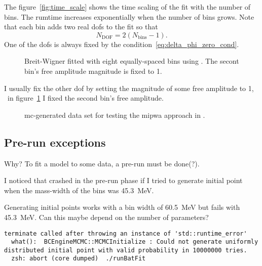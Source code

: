     The figure~\ref{fig:time_scale} shows the time scaling of the fit with the number of bins.
    The rumtime increases exponentially when the number of bins grows.
    Note that each bin adds two real \acp{dof} to the fit so that
    \begin{equation}
        N_\text{DOF} = 2(N_\text{bins} - 1).
    \end{equation}
    One of the \acp{dof} is always fixed by the condition~\eqref{eq:delta_phi_zero_cond}.
    \begin{figure}
        \centering
        
        \caption{Breit-Wigner fitted with eight equally-spaced bins using .
                 The secont bin's free amplitude magnitude is fixed to \num{1}.}
        \label{fig:mi_test_fit_amp_8bins}
    \end{figure}
    I usually fix the other \ac{dof} by setting the magnitude of some free amplitude to \num{1}, \eg{}~in figure~\ref{fig:mi_test_fit_amp_8bins} I fixed the second bin's free amplitude.


\begin{figure}
    \centering
    \caption{\ac{mc}-generated data set for testing the \ac{mipwa} approach in .}
    \label{fig:mi_test_data}
\end{figure}

    \subsection{Pre-run exceptions}

    {\color{red} Why?
    To fit a model to some data, a pre-run must be done(?).
    }

    I noticed that  crashed in the pre-run phase if I tried to generate initial point when the mass-width of the bins was \SI{45.3}{\mega\electronvolt}.

    Generating initial points works with a bin width of \SI{60.5}{\mega\electronvolt} but fails with \SI{45.3}{\mega\electronvolt}.
    Can this maybe depend on the number of parameters?

    \begin{lstlisting}
terminate called after throwing an instance of 'std::runtime_error'
  what():  BCEngineMCMC::MCMCInitialize : Could not generate uniformly distributed initial point with valid probability in 10000000 tries.
  zsh: abort (core dumped)  ./runBatFit
    \end{lstlisting}

